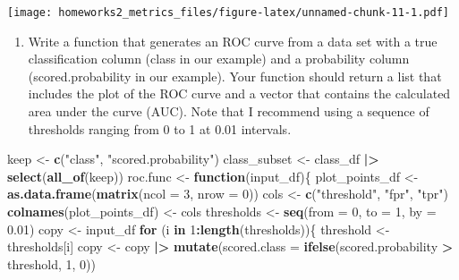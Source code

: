\documentclass[
]{article}
\newenvironment{Shaded}{\begin{snugshade}}{\end{snugshade}}
\newcommand{\AttributeTok}[1]{\textcolor[rgb]{0.13,0.29,0.53}{#1}}
\newcommand{\ControlFlowTok}[1]{\textcolor[rgb]{0.13,0.29,0.53}{\textbf{#1}}}
\newcommand{\DecValTok}[1]{\textcolor[rgb]{0.00,0.00,0.81}{#1}}
\newcommand{\FloatTok}[1]{\textcolor[rgb]{0.00,0.00,0.81}{#1}}
\newcommand{\FunctionTok}[1]{\textcolor[rgb]{0.13,0.29,0.53}{\textbf{#1}}}
\newcommand{\NormalTok}[1]{#1}
\newcommand{\OtherTok}[1]{\textcolor[rgb]{0.56,0.35,0.01}{#1}}
\newcommand{\SpecialCharTok}[1]{\textcolor[rgb]{0.81,0.36,0.00}{\textbf{#1}}}
\newcommand{\StringTok}[1]{\textcolor[rgb]{0.31,0.60,0.02}{#1}}
\providecommand{\tightlist}{%
  \setlength{\itemsep}{0pt}\setlength{\parskip}{0pt}}
\begin{document}
\texttt{[image: homeworks2\_metrics\_files/figure-latex/unnamed-chunk-11-1.pdf]}

\begin{enumerate}
\def\labelenumi{\arabic{enumi}.}
\setcounter{enumi}{9}
\tightlist
\item
  Write a function that generates an ROC curve from a data set with a
  true classification column (class in our example) and a probability
  column (scored.probability in our example). Your function should
  return a list that includes the plot of the ROC curve and a vector
  that contains the calculated area under the curve (AUC). Note that I
  recommend using a sequence of thresholds ranging from 0 to 1 at 0.01
  intervals.
\end{enumerate}

\begin{Shaded}
\begin{Highlighting}[]
\NormalTok{keep }\OtherTok{\textless{}{-}} \FunctionTok{c}\NormalTok{(}\StringTok{"class"}\NormalTok{, }\StringTok{"scored.probability"}\NormalTok{)}
\NormalTok{class\_subset }\OtherTok{\textless{}{-}}\NormalTok{ class\_df }\SpecialCharTok{|\textgreater{}}
    \FunctionTok{select}\NormalTok{(}\FunctionTok{all\_of}\NormalTok{(keep))}
\NormalTok{roc.func }\OtherTok{\textless{}{-}} \ControlFlowTok{function}\NormalTok{(input\_df)\{}
\NormalTok{    plot\_points\_df }\OtherTok{\textless{}{-}} \FunctionTok{as.data.frame}\NormalTok{(}\FunctionTok{matrix}\NormalTok{(}\AttributeTok{ncol =} \DecValTok{3}\NormalTok{, }\AttributeTok{nrow =} \DecValTok{0}\NormalTok{))}
\NormalTok{    cols }\OtherTok{\textless{}{-}} \FunctionTok{c}\NormalTok{(}\StringTok{"threshold"}\NormalTok{, }\StringTok{"fpr"}\NormalTok{, }\StringTok{"tpr"}\NormalTok{)}
    \FunctionTok{colnames}\NormalTok{(plot\_points\_df) }\OtherTok{\textless{}{-}}\NormalTok{ cols}
\NormalTok{    thresholds }\OtherTok{\textless{}{-}} \FunctionTok{seq}\NormalTok{(}\AttributeTok{from =} \DecValTok{0}\NormalTok{, }\AttributeTok{to =} \DecValTok{1}\NormalTok{, }\AttributeTok{by =} \FloatTok{0.01}\NormalTok{)}
\NormalTok{    copy }\OtherTok{\textless{}{-}}\NormalTok{ input\_df}
    \ControlFlowTok{for}\NormalTok{ (i }\ControlFlowTok{in} \DecValTok{1}\SpecialCharTok{:}\FunctionTok{length}\NormalTok{(thresholds))\{}
\NormalTok{        threshold }\OtherTok{\textless{}{-}}\NormalTok{ thresholds[i]}
\NormalTok{        copy }\OtherTok{\textless{}{-}}\NormalTok{ copy }\SpecialCharTok{|\textgreater{}}
            \FunctionTok{mutate}\NormalTok{(}\AttributeTok{scored.class =} \FunctionTok{ifelse}\NormalTok{(scored.probability }\SpecialCharTok{\textgreater{}}\NormalTok{ threshold, }\DecValTok{1}\NormalTok{, }\DecValTok{0}\NormalTok{))}

\end{Highlighting}
\end{Shaded}
\end{document}
